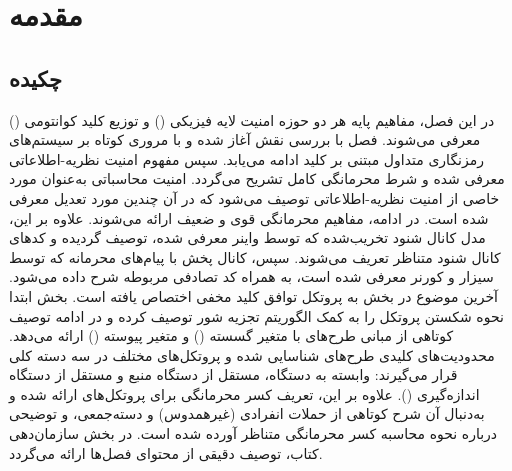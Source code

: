 \chapter{مقدمه}
\label{chap:1}


\section*{چکیده}

در این فصل، مفاهیم پایه هر دو حوزه امنیت لایه فیزیکی () و توزیع کلید کوانتومی () معرفی می‌شوند. فصل با بررسی نقش  آغاز شده و با مروری کوتاه بر سیستم‌های رمزنگاری متداول مبتنی بر کلید ادامه می‌یابد. سپس مفهوم امنیت نظریه-اطلاعاتی معرفی شده و شرط محرمانگی کامل تشریح می‌گردد. امنیت محاسباتی به‌عنوان مورد خاصی از امنیت نظریه-اطلاعاتی توصیف می‌شود که در آن چندین مورد تعدیل معرفی شده است. در ادامه، مفاهیم محرمانگی قوی و ضعیف ارائه می‌شوند. علاوه بر این، مدل کانال شنود تخریب‌شده که توسط واینر معرفی شده، توصیف گردیده و کدهای کانال شنود متناظر تعریف می‌شوند. سپس، کانال پخش با پیام‌های محرمانه که توسط سیزار و کورنر معرفی شده است، به همراه کد تصادفی مربوطه شرح داده می‌شود. آخرین موضوع در بخش  به پروتکل توافق کلید مخفی اختصاص یافته است. بخش  ابتدا نحوه شکستن پروتکل  را به کمک الگوریتم تجزیه شور توصیف کرده و در ادامه توصیف کوتاهی از مبانی طرح‌های  با متغیر گسسته () و متغیر پیوسته () ارائه می‌دهد. محدودیت‌های کلیدی طرح‌های  شناسایی شده و پروتکل‌های مختلف  در سه دسته کلی قرار می‌گیرند:  وابسته به دستگاه،  مستقل از دستگاه منبع و  مستقل از دستگاه اندازه‌گیری (). علاوه بر این، تعریف کسر محرمانگی برای پروتکل‌های  ارائه شده و به‌دنبال آن شرح کوتاهی از حملات انفرادی (غیرهمدوس) و دسته‌جمعی، و توضیحی درباره نحوه محاسبه کسر محرمانگی متناظر آورده شده است. در بخش سازمان‌دهی کتاب، توصیف دقیقی از محتوای فصل‌ها ارائه می‌گردد.

